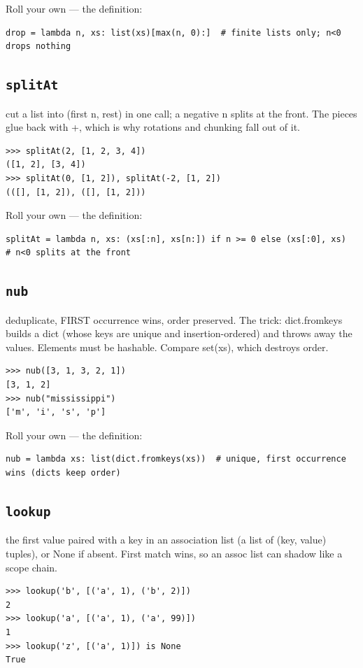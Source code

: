 \documentclass[10pt,letterpaper]{book}
\begin{document}
Roll your own --- the definition:

\begin{lstlisting}[style=ex]
drop = lambda n, xs: list(xs)[max(n, 0):]  # finite lists only; n<0 drops nothing
\end{lstlisting}
\subsection{\texttt{splitAt}}\label{def:splitAt}
cut a list into (first n, rest) in one call; a negative n splits at the front. The pieces glue back with +, which is why rotations and chunking fall out of it.
\begin{lstlisting}[style=ex]
>>> splitAt(2, [1, 2, 3, 4])
([1, 2], [3, 4])
>>> splitAt(0, [1, 2]), splitAt(-2, [1, 2])
(([], [1, 2]), ([], [1, 2]))
\end{lstlisting}

Roll your own --- the definition:

\begin{lstlisting}[style=ex]
splitAt = lambda n, xs: (xs[:n], xs[n:]) if n >= 0 else (xs[:0], xs)  # n<0 splits at the front
\end{lstlisting}
\subsection{\texttt{nub}}\label{def:nub}
deduplicate, FIRST occurrence wins, order preserved. The trick: dict.fromkeys builds a dict (whose keys are unique and insertion-ordered) and throws away the values. Elements must be hashable. Compare set(xs), which destroys order.
\begin{lstlisting}[style=ex]
>>> nub([3, 1, 3, 2, 1])
[3, 1, 2]
>>> nub("mississippi")
['m', 'i', 's', 'p']
\end{lstlisting}

Roll your own --- the definition:

\begin{lstlisting}[style=ex]
nub = lambda xs: list(dict.fromkeys(xs))  # unique, first occurrence wins (dicts keep order)
\end{lstlisting}
\subsection{\texttt{lookup}}\label{def:lookup}
the first value paired with a key in an association list (a list of (key, value) tuples), or None if absent. First match wins, so an assoc list can shadow like a scope chain.
\begin{lstlisting}[style=ex]
>>> lookup('b', [('a', 1), ('b', 2)])
2
>>> lookup('a', [('a', 1), ('a', 99)])
1
>>> lookup('z', [('a', 1)]) is None
True
\end{lstlisting}
\end{document}
